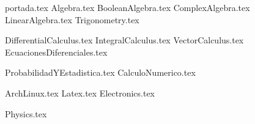 
{portada.tex}
\newpage
\tableofcontents
\printindex
\newpage
{Algebra.tex}
{BooleanAlgebra.tex}
{ComplexAlgebra.tex}
{LinearAlgebra.tex}
{Trigonometry.tex}  %

{DifferentialCalculus.tex}  %
{IntegralCalculus.tex}  %
{VectorCalculus.tex}
{EcuacionesDiferenciales.tex}

{ProbabilidadYEstadistica.tex}
{CalculoNumerico.tex}

{ArchLinux.tex}
{Latex.tex}
{Electronics.tex}

{Physics.tex}
